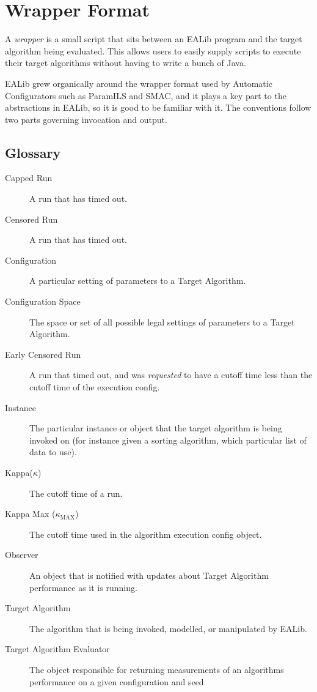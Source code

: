 \documentclass[11pt,letterpaper,oneside]{article}
\begin{document}
\section{Wrapper Format}
\label{wrapper}
A \emph{wrapper} is a small script that sits between an EALib program and the target algorithm being evaluated. This allows users to easily supply scripts to execute their target algorithms without having to write a bunch of Java. 

EALib grew organically around the wrapper format used by Automatic Configurators such as ParamILS and SMAC, and it plays a key part to the abstractions in EALib, so it is good to be familiar with it. The conventions follow two parts governing invocation and output.



\subsection{Glossary}

\begin{description}

\item[Capped Run] A run that has timed out.
\item[Censored Run] A run that has timed out.
\item[Configuration] A particular setting of parameters to a Target Algorithm.
\item[Configuration Space] The space or set of all possible legal settings of parameters to a Target Algorithm.
\item[Early Censored Run] A run that timed out, and was \emph{requested} to have a cutoff time less than the cutoff time of the execution config.

\item[Instance] The particular instance or object that the target algorithm is being invoked on (for instance given a sorting algorithm, which particular list of data to use).
\item[Kappa($\kappa$)] The cutoff time of a run.
\item[Kappa Max ($\kappa_{\text{MAX}}$)] The cutoff time used in the algorithm execution config object.
\item[Observer] An object that is notified with updates about Target Algorithm performance as it is running.
\item[Target Algorithm] The algorithm that is being invoked, modelled, or manipulated by EALib.
\item[Target Algorithm Evaluator] The object responsible for returning measurements of an algorithms performance on a given configuration and seed

\end{description}
\end{document}
